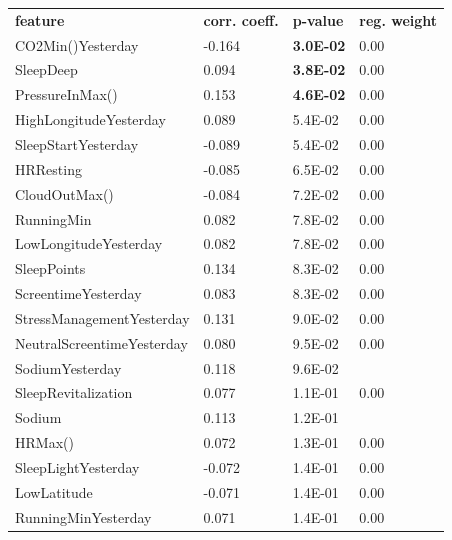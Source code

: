\documentclass[conference]{IEEEtran}
\begin{document}
\begin{table}[]
\begin{tabular}{llll}
\textbf{feature} & \textbf{corr. coeff.} & \textbf{p-value} & \textbf{reg. weight} \\
CO2Min()Yesterday              & -0.164 & \textbf{3.0E-02} & 0.00           \\
SleepDeep                      & 0.094  & \textbf{3.8E-02} & 0.00           \\
PressureInMax()                & 0.153  & \textbf{4.6E-02} & 0.00           \\
HighLongitudeYesterday         & 0.089  & 5.4E-02          & 0.00           \\
SleepStartYesterday            & -0.089 & 5.4E-02          & 0.00           \\
HRResting                      & -0.085 & 6.5E-02          & 0.00           \\
CloudOutMax()                  & -0.084 & 7.2E-02          & 0.00           \\
RunningMin                     & 0.082  & 7.8E-02          & 0.00           \\
LowLongitudeYesterday          & 0.082  & 7.8E-02          & 0.00           \\
SleepPoints                    & 0.134  & 8.3E-02          & 0.00           \\
ScreentimeYesterday            & 0.083  & 8.3E-02          & 0.00           \\
StressManagementYesterday      & 0.131  & 9.0E-02          & 0.00           \\
NeutralScreentimeYesterday     & 0.080  & 9.5E-02          & 0.00           \\
SodiumYesterday                & 0.118  & 9.6E-02          &                \\
SleepRevitalization            & 0.077  & 1.1E-01          & 0.00           \\
Sodium                         & 0.113  & 1.2E-01          &                \\
HRMax()                        & 0.072  & 1.3E-01          & 0.00           \\
SleepLightYesterday            & -0.072 & 1.4E-01          & 0.00           \\
LowLatitude                    & -0.071 & 1.4E-01          & 0.00           \\
RunningMinYesterday            & 0.071  & 1.4E-01          & 0.00           \\

\end{tabular}
\end{table}
\end{document}
